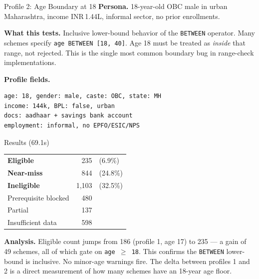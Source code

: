\documentclass[11pt,a4paper]{article}
\newcommand{\rupee}{INR\,}
\newcommand{\ic}[1]{\texttt{\color{accent}#1}}
\begin{document}
\begin{profilebox}{Profile 2: Age Boundary at 18}
\textbf{Persona.} 18-year-old OBC male in urban Maharashtra, income \rupee 1.44L, informal sector, no prior enrollments.

\textbf{What this tests.} Inclusive lower-bound behavior of the \ic{BETWEEN} operator. Many schemes specify \ic{age BETWEEN [18, 40]}. Age 18 must be treated as \textit{inside} that range, not rejected. This is the single most common boundary bug in range-check implementations.

\textbf{Profile fields.}
\begin{lstlisting}
age: 18, gender: male, caste: OBC, state: MH
income: 144k, BPL: false, urban
docs: aadhaar + savings bank account
employment: informal, no EPFO/ESIC/NPS
\end{lstlisting}

\begin{resultbox}{Results (69.1s)}
\begin{tabular}{@{}lrl@{}}
  \textcolor{eligible}{\textbf{Eligible}} & 235 & (6.9\%) \\
  \textcolor{nearmiss}{\textbf{Near-miss}} & 844 & (24.8\%) \\
  \textcolor{inelig}{\textbf{Ineligible}} & 1{,}103 & (32.5\%) \\
  Prerequisite blocked & 480 & \\
  Partial & 137 & \\
  Insufficient data & 598 & \\
\end{tabular}
\end{resultbox}

\textbf{Analysis.} Eligible count jumps from 186 (profile 1, age 17) to 235 --- a gain of 49 schemes, all of which gate on \ic{age $\geq$ 18}. This confirms the \ic{BETWEEN} lower-bound is inclusive. No minor-age warnings fire. The delta between profiles 1 and 2 is a direct measurement of how many schemes have an 18-year age floor.
\end{profilebox}
\end{document}
